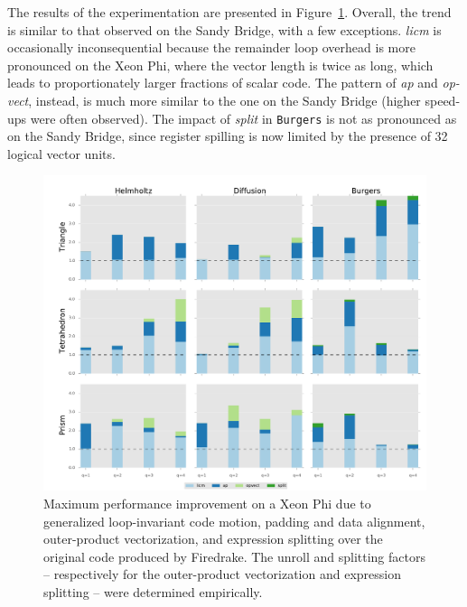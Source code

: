 The results of the experimentation are presented in Figure~\ref{fig:coffee-individual-res-phi}. Overall, the trend is similar to that observed on the Sandy Bridge, with a few exceptions. {\em licm} is occasionally inconsequential because the remainder loop overhead is more pronounced on the Xeon Phi, where the vector length is twice as long, which leads to proportionately larger fractions of scalar code. The pattern of {\em ap} and {\em op-vect}, instead, is much more similar to the one on the Sandy Bridge (higher speed-ups were often observed). The impact of {\em split} in {\tt Burgers} is not as pronounced as on the Sandy Bridge, since register spilling is now limited by the presence of 32 logical vector units. 

\begin{figure}[t]
\centerline{\includegraphics[scale=0.45]{lowlevelopt/perf-results/individual/plot_phi}}
\caption{Maximum performance improvement on a Xeon Phi due to generalized loop-invariant code motion, padding and data alignment, outer-product vectorization, and expression splitting over the original code produced by Firedrake. The unroll and splitting factors -- respectively for the outer-product vectorization and expression splitting -- were determined empirically.}
\label{fig:coffee-individual-res-phi}
\end{figure}



